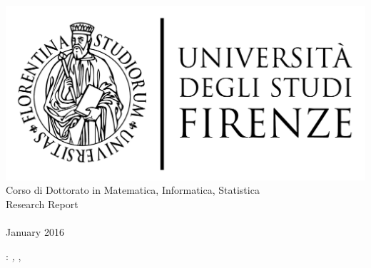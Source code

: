 
\begin{titlepage}
    \begin{center}
    \large
      \hfill
      \vfill
      \begingroup
         \includegraphics[scale=0.15]{gfx/logo/unifi}\\
            Corso di Dottorato in Matematica, Informatica, Statistica\\ 
            \vspace{0.5cm}
         \vspace{0.5cm}    
         Research Report
      \endgroup 
      \vfill 
      \begingroup
        \color{Maroon} \\ $\ $\\
    \bigskip
      \endgroup
      \vfill  
      \vfill                   
        January 2016
      \vfill                      
    \end{center}        
\end{titlepage}   

\newpage
\thispagestyle{empty}
\hfill
\vfill
\noindent\myName: 
\textit{\myTitle,} 
\myDegree, \textcopyright\ \myTime

